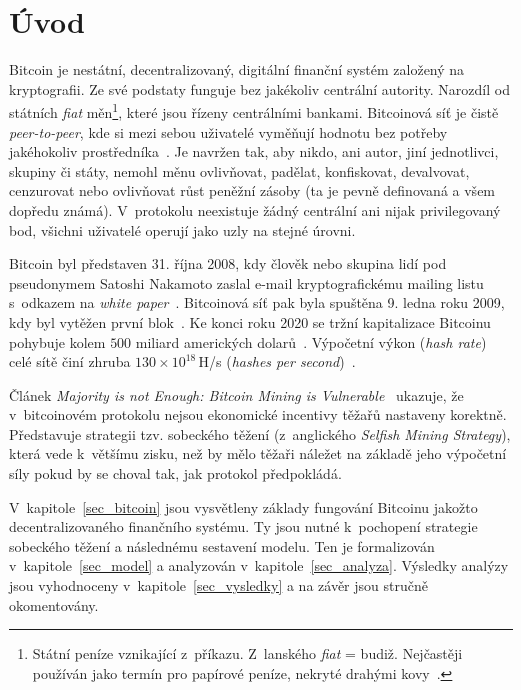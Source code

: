 
\section{Úvod}
\label{sec_uvod}

Bitcoin je nestátní, decentralizovaný, digitální finanční systém založený na kryptografii. Ze své podstaty funguje bez jakékoliv centrální autority. Narozdíl od státních \textit{fiat} měn\footnote{Státní peníze vznikající z~příkazu. Z~lanského \textit{fiat} = budiž. Nejčastěji používán jako termín pro papírové peníze, nekryté drahými kovy~\cite{bib_odluka_penez}.}, které jsou řízeny centrálními bankami. Bitcoinová síť je čistě \textit{peer-to-peer}, kde si mezi sebou uživatelé vyměňují hodnotu bez potřeby jakéhokoliv prostředníka~\cite{bib_white_paper}. Je navržen tak, aby nikdo, ani autor, jiní jednotlivci, skupiny či státy, nemohl měnu ovlivňovat, padělat, konfiskovat, devalvovat, cenzurovat nebo ovlivňovat růst peněžní zásoby (ta je pevně definovaná a všem dopředu známá). V~protokolu neexistuje žádný centrální ani nijak privilegovaný bod, všichni uživatelé operují jako uzly na stejné úrovni.

Bitcoin byl představen 31. října 2008, kdy člověk nebo skupina lidí pod pseudonymem Satoshi Nakamoto zaslal e-mail kryptografickému mailing listu s~odkazem na \textit{white paper}~\cite{bib_mailing_list}. Bitcoinová síť pak byla spuštěna 9. ledna roku 2009, kdy byl vytěžen první blok~\cite{bib_first_block}. Ke konci roku 2020 se  tržní kapitalizace Bitcoinu pohybuje kolem $500$ miliard amerických dolarů~\cite{bib_market_cap}. Výpočetní výkon (\textit{hash rate}) celé sítě činí zhruba $130 \times 10^{18}$\,H/s (\textit{hashes per second})~\cite{bib_hash_rate}.

Článek \textit{Majority is not Enough: Bitcoin Mining is Vulnerable}~\cite{bib_paper} ukazuje, že v~bitcoinovém protokolu nejsou ekonomické incentivy těžařů nastaveny korektně. Představuje strategii tzv. sobeckého těžení (z~anglického \textit{Selfish Mining Strategy}), která vede k~většímu zisku, než by mělo těžaři náležet na základě jeho výpočetní síly pokud by se choval tak, jak protokol předpokládá.

V~kapitole~\ref{sec_bitcoin} jsou vysvětleny základy fungování Bitcoinu jakožto decentralizovaného finančního systému. Ty jsou nutné k~pochopení strategie sobeckého těžení a následnému sestavení modelu. Ten je formalizován v~kapitole~\ref{sec_model} a analyzován v~kapitole~\ref{sec_analyza}. Výsledky analýzy jsou vyhodnoceny v~kapitole~\ref{sec_vysledky} a na závěr jsou stručně okomentovány.

